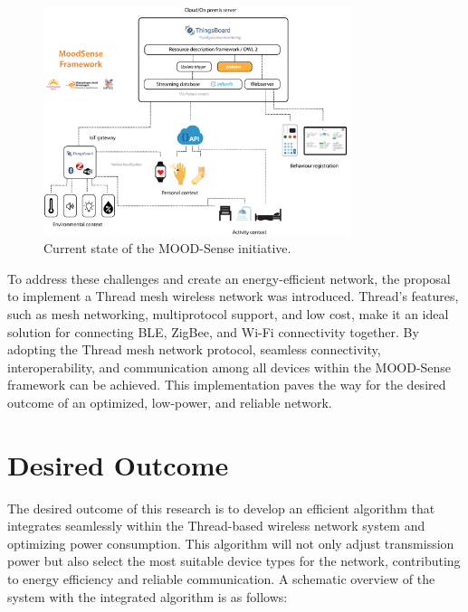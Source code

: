 \begin{figure}[H]
    \centering
    \includegraphics[width=0.8\textwidth]{images/rationale/rationale_present_situation.png}
    \caption{Current state of the MOOD-Sense initiative.}
    \label{fig:rationale_present_situation}
\end{figure}

To address these challenges and create an energy-efficient network, the proposal to implement a Thread mesh wireless network was introduced. Thread's features, such as mesh networking, multiprotocol support, and low cost, make it an ideal solution for connecting \gls{BLE}, ZigBee, and Wi-Fi connectivity together. By adopting the Thread mesh network protocol, seamless connectivity, interoperability, and communication among all devices within the MOOD-Sense framework can be achieved. This implementation paves the way for the desired outcome of an optimized, low-power, and reliable network.


\section{Desired Outcome}\label{sec:desired_outcome}
The desired outcome of this research is to develop an efficient algorithm that integrates seamlessly within the Thread-based wireless network system and optimizing power consumption. This algorithm will not only adjust transmission power but also select the most suitable device types for the network, contributing to energy efficiency and reliable communication. A schematic overview of the system with the integrated algorithm is as follows:

